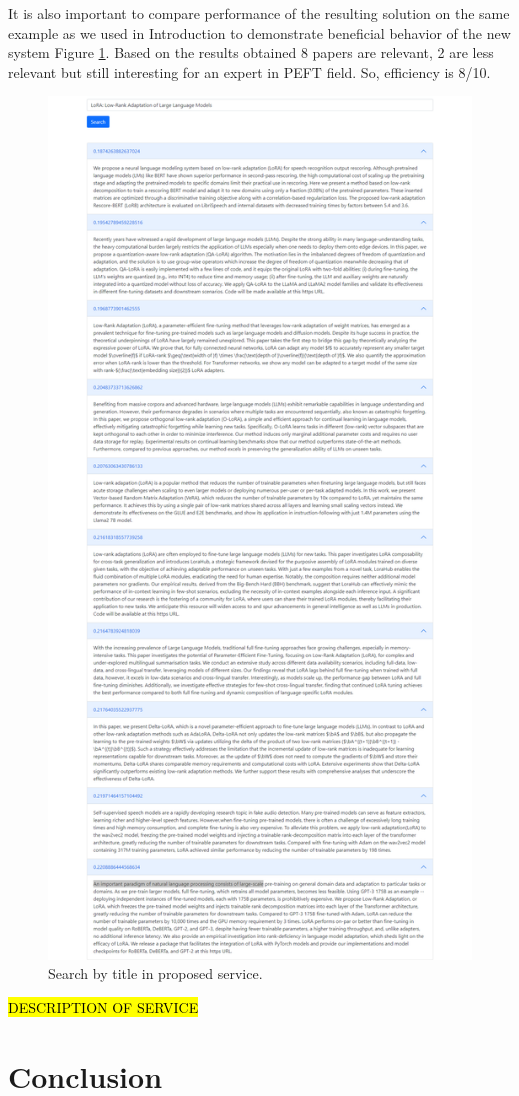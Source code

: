 \documentclass{article}
\begin{document}
    It is also important to compare performance of the resulting solution on the same example as we used in Introduction to demonstrate beneficial behavior of the new system Figure \ref{fig:aziri-search}. Based on the results obtained 8 papers are relevant, 2 are less relevant but still interesting for an expert in PEFT field. So, efficiency is 8/10.

    \begin{figure}[H]
        \centering
        \includegraphics[width=0.7\linewidth]{img/search_aziri.png}
        \caption{Search by title in proposed service.}
        \label{fig:aziri-search}
    \end{figure}

    \hl{DESCRIPTION OF SERVICE}
    

\section{Conclusion}
    
\end{document}
